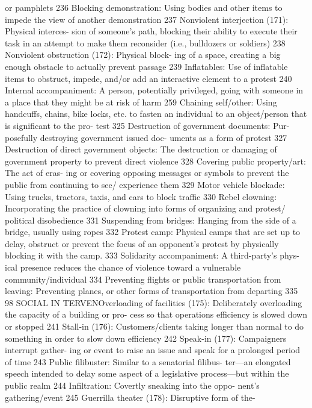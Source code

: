 \documentclass[twoside,a4paper,12pt,fleqn,openany]{extbook}
\begin{document}
or pamphlets
 236
Blocking demonstration: Using bodies and
other items to impede the view of another
demonstration
 237
Nonviolent interjection (171): Physical interces-
sion of someone’s path, blocking their ability to
execute their task in an attempt to make them
reconsider (i.e., bulldozers or soldiers)
 238
Nonviolent obstruction (172): Physical block-
ing of a space, creating a big enough obstacle
to actually prevent passage
 239
Inflatables: Use of inflatable items to obstruct,
impede, and/or add an interactive element to
a protest
 240
Internal accompaniment: A person, potentially
privileged, going with someone in a place that
they might be at risk of harm
 259
Chaining self/other: Using handcuffs, chains,
bike locks, etc. to fasten an individual to an
object/person that is significant to the pro-
test
 325
Destruction of government documents: Pur-
posefully destroying government issued doc-
uments as a form of protest
 327
Destruction of direct government objects:
The destruction or damaging of government
property to prevent direct violence
 328
Covering public property/art: The act of eras-
ing or covering opposing messages or symbols
to prevent the public from continuing to see/
experience them
 329
Motor vehicle blockade: Using trucks, tractors,
taxis, and cars to block traffic
 330
Rebel clowning: Incorporating the practice of
clowning into forms of organizing and protest/
political disobedience
 331
Suspending from bridges: Hanging from the
side of a bridge, usually using ropes
 332
Protest camp: Physical camps that are set up
to delay, obstruct or prevent the focus of an
opponent’s protest by physically blocking it
with the camp.
 333
Solidarity accompaniment: A third-party’s phys-
ical presence reduces the chance of violence
toward a vulnerable community/individual 334
Preventing flights or public transportation
from leaving: Preventing planes, or other forms
of transportation from departing
 335
98
SOCIAL IN TERVENOverloading of facilities (175): Deliberately
overloading the capacity of a building or pro-
cess so that operations efficiency is slowed
down or stopped
 241
Stall-in (176): Customers/clients taking longer
than normal to do something in order to slow
down efficiency
 242
Speak-in (177): Campaigners interrupt gather-
ing or event to raise an issue and speak for a
prolonged period of time
 243
Public filibuster: Similar to a senatorial filibus-
ter—an elongated speech intended to delay
some aspect of a legislative process—but
within the public realm
 244
Infiltration: Covertly sneaking into the oppo-
nent’s gathering/event
 245
Guerrilla theater (178): Disruptive form of the-
\end{document}
